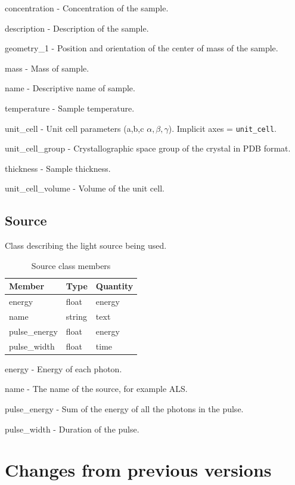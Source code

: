 \documentclass[usletter,11pt]{article}
\newcommand{\member}[2]
{ \noindent
{ \color{softBlue}  #1 - } #2
\vspace{0.2cm}
}
\begin{document}
\member{concentration}{Concentration of the sample.}

\member{description}{Description of the sample.}

\member{geometry\_1}{Position and orientation of the center of mass of the sample.}

\member{mass}{Mass of sample.}

\member{name}{Descriptive name of sample.}

\member{temperature}{Sample temperature.}

\member{unit\_cell}{Unit cell parameters (a,b,c
  $\alpha,\beta,\gamma$). Implicit axes = {\tt unit\_cell}.}

\member{unit\_cell\_group}{Crystallographic space group of the crystal
  in PDB format.}

\member{thickness}{Sample thickness.}

\member{unit\_cell\_volume}{Volume of the unit cell.}


\subsection{Source}
\label{table:source}

Class describing the light source being used.

\begin{table}[h!]\sffamily \footnotesize
\caption{Source class members}

\begin{tabular}{p{4.5cm} p{4.5cm}  p{2.5cm} }
\toprule
\bfseries Member     & \bfseries Type & \bfseries Quantity \\
\midrule
energy     & float & energy  \\
name     & string & text  \\
pulse\_energy  & float & energy  \\
pulse\_width  & float & time  \\
\bottomrule
\end{tabular}
\end{table}

\member{energy}{Energy of each photon.}

\member{name}{The name of the source, for example ALS.}

\member{pulse\_energy}{Sum of the energy of all the photons in the pulse.}

\member{pulse\_width}{Duration of the pulse.}

\clearpage
\section{Changes from previous versions}
\end{document}
